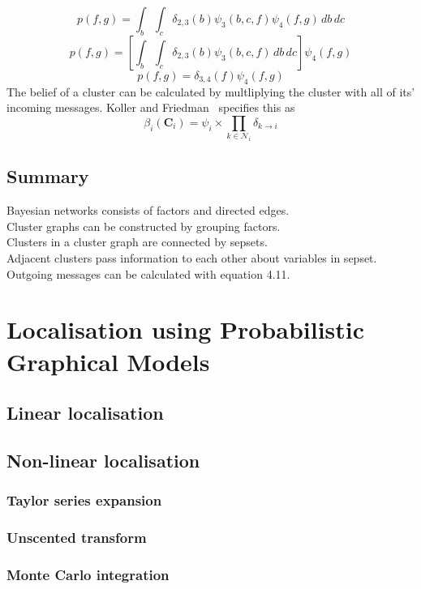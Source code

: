\documentclass[12pt,oneside,openany,a4paper, %
afrikaans,english,
]{memoir}
\numberwithin{equation}{chapter}
\begin{document}
\begin{equation}
p(f,g) = \int_b\int_c\delta_{2,3}(b)\psi_3(b,c,f)\psi_4(f,g)\,db\,dc
\end{equation}
\begin{equation}
p(f,g) = \left[\int_b\int_c\delta_{2,3}(b)\psi_3(b,c,f)\,db\,dc\right]\psi_4(f,g)
\end{equation}
\begin{equation}\label{eq:endeq}
p(f,g) = \delta_{3,4}(f)\psi_4(f,g)
\end{equation}
The belief of a cluster can be calculated by multliplying the cluster with all of its' incoming messages. Koller and Friedman~\cite{koller} specifies this as
\begin{equation}
\beta_i(\bm{C}_i) = \psi_i \times \prod_{k \in \mathcal{N}_i} \delta_{k \to i}
\end{equation}
\section{Summary}
Bayesian networks consists of factors and directed edges.\\
Cluster graphs can be constructed by grouping factors.\\
Clusters in a cluster graph are connected by sepsets.\\
Adjacent clusters pass information to each other about variables in sepset.\\
Outgoing messages can be calculated with equation 4.11.

\chapter{Localisation using Probabilistic Graphical Models}
\section{Linear localisation}
\section{Non-linear localisation}
\subsection{Taylor series expansion}
\subsection{Unscented transform}
\subsection{Monte Carlo integration}

\backmatter
{}
\end{document}
